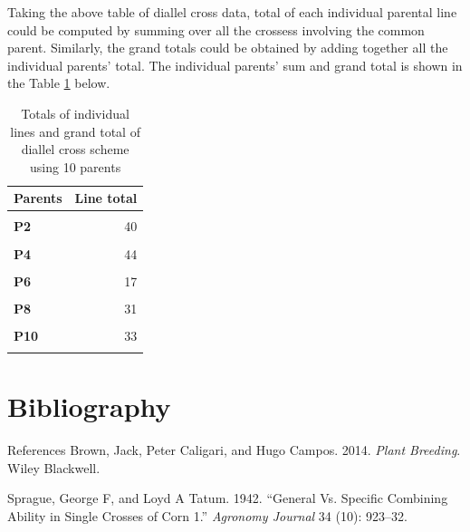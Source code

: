 \documentclass[11pt,dvipsnames,ignorenonframetext,aspectratio=169]{beamer}
\newlength{\cslhangindent}
\newenvironment{CSLReferences}%
  {\setlength{\parindent}{0pt}%
  \everypar{\setlength{\hangindent}{\cslhangindent}}\ignorespaces}%
  {\par}
\begin{document}
\begin{frame}{}
\footnotesize

Taking the above table of diallel cross data, total of each individual
parental line could be computed by summing over all the crossess
involving the common parent. Similarly, the grand totals could be
obtained by adding together all the individual parents' total. The
individual parents' sum and grand total is shown in the Table
\ref{tab:sum-over-ind} below.
\end{frame}

\begin{frame}{}
\protect\hypertarget{section-17}{}
\begin{table}

\caption{\label{tab:sum-over-ind}Totals of individual lines and grand total of diallel cross
 scheme using 10 parents}
\centering
\fontsize{8}{10}\selectfont
\begin{tabular}[t]{>{}lr}
\toprule
Parents & Line total\\
\midrule
\textbf{\cellcolor{gray!6}{P1}} & \cellcolor{gray!6}{15}\\
\textbf{P2} & 40\\
\textbf{\cellcolor{gray!6}{P3}} & \cellcolor{gray!6}{45}\\
\textbf{P4} & 44\\
\textbf{\cellcolor{gray!6}{P5}} & \cellcolor{gray!6}{30}\\
\addlinespace
\textbf{P6} & 17\\
\textbf{\cellcolor{gray!6}{P7}} & \cellcolor{gray!6}{30}\\
\textbf{P8} & 31\\
\textbf{\cellcolor{gray!6}{P9}} & \cellcolor{gray!6}{40}\\
\textbf{P10} & 33\\
\addlinespace
\textbf{\cellcolor{gray!6}{Total}} & \cellcolor{gray!6}{325}\\
\bottomrule
\end{tabular}
\end{table}
\end{frame}

\hypertarget{bibliography}{%
\section{Bibliography}\label{bibliography}}

\begin{frame}{References}
\protect\hypertarget{references}{}
\hypertarget{refs}{}
\begin{CSLReferences}{1}{0}
\leavevmode{}%
Brown, Jack, Peter Caligari, and Hugo Campos. 2014. \emph{Plant
Breeding}. Wiley Blackwell.

\leavevmode{}%
Sprague, George F, and Loyd A Tatum. 1942. {``General Vs. Specific
Combining Ability in Single Crosses of Corn 1.''} \emph{Agronomy
Journal} 34 (10): 923--32.

\end{CSLReferences}
\end{frame}
\end{document}
